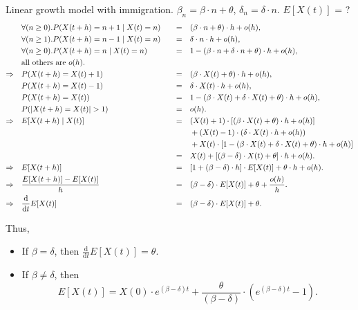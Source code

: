 \begin{question}
Linear growth model with immigration. $ \beta_{n} = \beta \cdot n + \theta $, $ \delta_{n} = \delta \cdot n $. $ E[X(t)] $ = ?
\begin{alignat*}{3}
  & \forall (n \ge 0). P(X(t + h) = n + 1 \mid X(t) = n)
    & \quad=\quad & (\beta \cdot n + \theta) \cdot h + o(h), \\
  & \forall (n \ge 1). P(X(t + h) = n - 1 \mid X(t) = n)
    & \quad=\quad & \delta \cdot n \cdot h + o(h), \\
  & \forall (n \ge 0). P(X(t + h) = n \mid X(t) = n)
    & \quad=\quad & 1 - (\beta \cdot n + \delta \cdot n + \theta) \cdot h + o(h), \\
  & \text{all others are $ o(h) $.} \\
\Rightarrow\quad
  & P(X(t + h) = X(t) + 1)
    & \quad=\quad & (\beta \cdot X(t) + \theta) \cdot h + o(h), \\
  & P(X(t + h) = X(t) - 1)
    & \quad=\quad & \delta \cdot X(t) \cdot h + o(h), \\
  & P(X(t + h) = X(t))
    & \quad=\quad & 1 - (\beta \cdot X(t) + \delta \cdot X(t) + \theta) \cdot h + o(h), \\
  & P(|X(t + h) = X(t)| > 1)
    & \quad=\quad & o(h). \\
\Rightarrow\quad
  & E[X(t + h) \mid X(t)]
    & \quad=\quad & (X(t) + 1) \cdot [(\beta \cdot X(t) + \theta) \cdot h + o(h)] \\
  & & & + (X(t) - 1) \cdot (\delta \cdot X(t) \cdot h + o(h)) \\
  & & & + X(t) \cdot [1 - (\beta \cdot X(t) + \delta \cdot X(t) + \theta) \cdot h + o(h)] \\
  & & \quad=\quad & X(t) + [(\beta - \delta) \cdot X(t) + \theta] \cdot h + o(h). \\
\Rightarrow\quad
  & E[X(t + h)]
    & \quad=\quad & [1 + (\beta - \delta) \cdot h] \cdot E[X(t)] + \theta \cdot h + o(h). \\
\Rightarrow\quad
  & \frac{E[X(t + h)] - E[X(t)]}{h}
    & \quad=\quad & (\beta - \delta) \cdot E[X(t)] + \theta + \frac{o(h)}{h}. \\
\Rightarrow\quad
  & \frac{\mathrm{d}}{\mathrm{d}t} E[X(t)]
    & \quad=\quad & (\beta - \delta) \cdot E[X(t)] + \theta. \\
\end{alignat*}

Thus,
\begin{itemize}
\item If $ \beta = \delta $, then $ \frac{\mathrm{d}}{\mathrm{d}t} E[X(t)] = \theta $.

\item If $ \beta \neq \delta $, then
\[ E[X(t)] = X(0) \cdot e^{(\beta - \delta)t} + \frac{\theta}{(\beta - \delta)} \cdot (e^{(\beta - \delta)t} - 1). \]
\end{itemize}

\begin{comment}
If $ \beta < \delta $,
\[ \lim_{t \to \infty} E[X(t)] = \frac{\theta}{\delta - \beta} > 0. \]
\end{comment}
\end{question}

